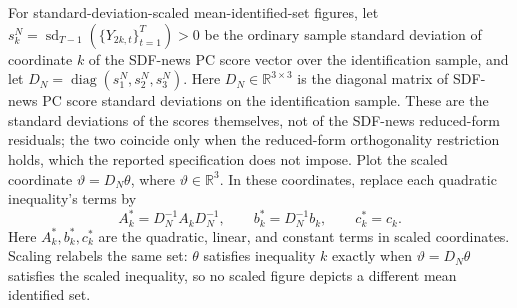\documentclass[11pt]{article}
\begin{document}
For standard-deviation-scaled mean-identified-set figures, let
\(s_k^N=\operatorname{sd}_{T-1}(\{Y_{2k,t}\}_{t=1}^{T})>0\) be the ordinary sample standard deviation
of coordinate \(k\) of the SDF-news PC score vector over the identification sample, and
let \(D_N=\operatorname{diag}(s_1^N,s_2^N,s_3^N)\). Here \(D_N\in\mathbb R^{3\times3}\) is the
diagonal matrix of SDF-news PC score standard deviations on the identification sample. These are the
standard deviations of the scores themselves, not of the SDF-news reduced-form residuals; the two
coincide only when the reduced-form orthogonality restriction holds, which the reported
specification does not impose.
Plot the scaled coordinate \(\vartheta=D_N\theta\), where \(\vartheta\in\mathbb R^3\). In these
coordinates, replace each quadratic inequality's terms by
\begin{equation*}
 A_k^*=D_N^{-1}A_kD_N^{-1},\qquad b_k^*=D_N^{-1}b_k,\qquad c_k^*=c_k.
\end{equation*}
Here \(A_k^*,b_k^*,c_k^*\) are the quadratic, linear, and constant terms in scaled coordinates.
Scaling relabels the same set: \(\theta\) satisfies inequality \(k\) exactly when \(\vartheta=D_N\theta\)
satisfies the scaled inequality, so no scaled figure depicts a different mean identified set.
\end{document}
